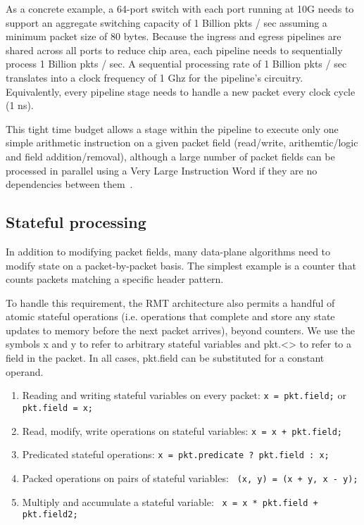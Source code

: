 As a concrete example, a 64-port switch with each port running at 10G needs to
support an aggregate switching capacity of 1 Billion pkts / sec assuming a
minimum packet size of 80 bytes.  Because the ingress and egress pipelines are
shared across all ports to reduce chip area, each pipeline needs to
sequentially process 1 Billion pkts / sec. A sequential processing rate of 1
Billion pkts / sec translates into a clock frequency of 1 Ghz for the
pipeline's circuitry.  Equivalently, every pipeline stage needs to handle a new
packet every clock cycle (1 ns).

This tight time budget allows a stage within the pipeline to execute only one
simple arithmetic instruction on a given packet field (read/write,
arithemtic/logic and field addition/removal), although a large number of packet
fields can be processed in parallel using a Very Large Instruction Word if they
are no dependencies between them~\cite{rmt}.

\subsection{Stateful processing}
In addition to modifying packet fields, many data-plane algorithms need to
modify state on a packet-by-packet basis. The simplest example is a counter
that counts packets matching a specific header pattern.

To handle this requirement, the RMT architecture also permits a handful of
atomic stateful operations (i.e. operations that complete and store any state
updates to memory before the next packet arrives), beyond counters.  We use the
symbols x and y to refer to arbitrary stateful variables and pkt.<> to refer to
a field in the packet. In all cases, pkt.field can be substituted for a
constant operand.
\begin{enumerate}
\item Reading and writing stateful variables on every packet:
      \texttt{x = pkt.field;} or \texttt{pkt.field = x;}
\item Read, modify, write operations on stateful variables:
      \texttt{x = x + pkt.field;}
\item Predicated stateful operations: \texttt{x = pkt.predicate ? pkt.field : x;}
\item Packed operations on pairs of stateful variables: \texttt{ (x, y) = (x + y, x - y);}
\item Multiply and accumulate a stateful variable: \texttt{ x = x * pkt.field + pkt.field2; }
\end{enumerate}


